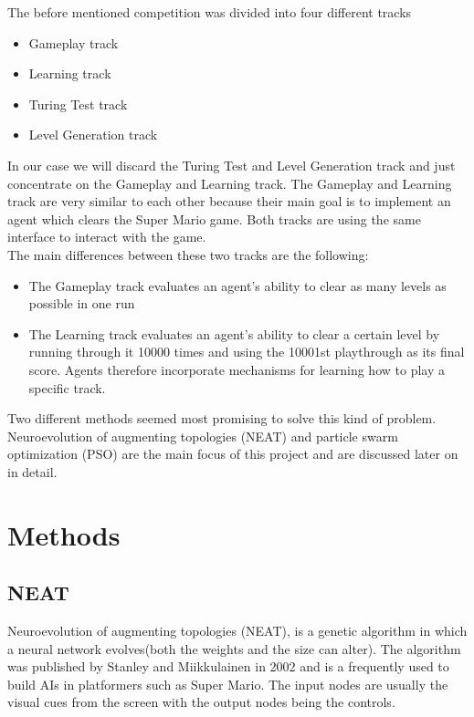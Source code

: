 \documentclass[]{article}
\begin{document}
The before mentioned competition was divided into four different tracks

\begin{itemize}
    \item Gameplay track
    \item Learning track
    \item Turing Test track
    \item Level Generation track
\end{itemize}

In our case we will discard the Turing Test and Level Generation track and just concentrate on the Gameplay and Learning track. The Gameplay and Learning track are very similar to each other because their main goal is to implement an agent which clears the Super Mario game. Both tracks are using the same interface to interact with the game.\\

The main differences between these two tracks are the following:

\begin{itemize}
    \item The Gameplay track evaluates an agent's ability to clear as many levels as possible in one run
    \item The Learning track evaluates an agent's ability to clear a certain level by running through it 10000 times and using the 10001st playthrough as its final score. Agents therefore incorporate mechanisms for learning how to play a specific track.
\end{itemize}

Two different methods seemed most promising to solve this kind of problem. Neuroevolution of augmenting topologies (NEAT) and particle swarm optimization (PSO) are the main focus of this project and are discussed later on in detail.

\section{Methods} \label{Methods}

\subsection{NEAT} \label{Methods_NEAT}
Neuroevolution of augmenting topologies (NEAT), is a genetic algorithm in which a neural network evolves(both the weights and the size can alter). The algorithm was published by Stanley and Miikkulainen in 2002 \cite{stanley2002evolving} and is a frequently used to build AIs in platformers such as Super Mario. The input nodes are usually the visual cues from the screen with the output nodes being the controls.\bigskip
\end{document}
